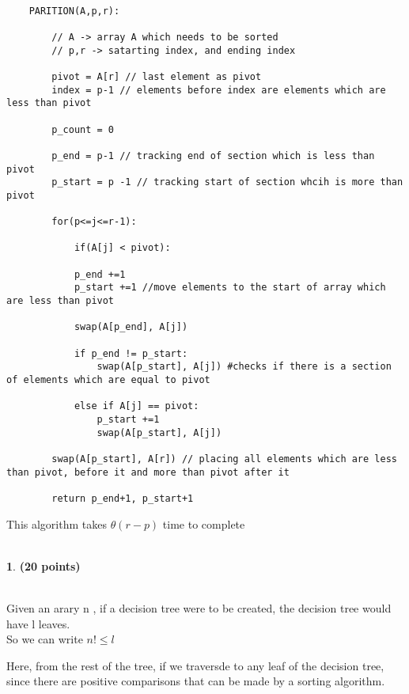 \documentclass[11pt]{article}
\theoremstyle{definition}
\newtheorem{prob}{}
\newcommand{\solution}{\medskip\noindent{\color{DarkBlue}\textbf{Solution:}}}
\begin{document}
\begin{verbatim}
    
    PARITION(A,p,r):

        // A -> array A which needs to be sorted
        // p,r -> satarting index, and ending index

        pivot = A[r] // last element as pivot
        index = p-1 // elements before index are elements which are less than pivot

        p_count = 0

        p_end = p-1 // tracking end of section which is less than pivot
        p_start = p -1 // tracking start of section whcih is more than pivot

        for(p<=j<=r-1):

            if(A[j] < pivot):

            p_end +=1
            p_start +=1 //move elements to the start of array which are less than pivot

            swap(A[p_end], A[j])

            if p_end != p_start:
                swap(A[p_start], A[j]) #checks if there is a section of elements which are equal to pivot

            else if A[j] == pivot:
                p_start +=1
                swap(A[p_start], A[j])
        
        swap(A[p_start], A[r]) // placing all elements which are less than pivot, before it and more than pivot after it

        return p_end+1, p_start+1

\end{verbatim}

This algorithm takes $\theta(r-p)$ time to complete \\ \\ 

\begin{prob} \textbf{(20 points)}
\end{prob}
\solution \\

Given an arary n , if a decision tree were to be created, the decision tree would have l leaves. \\

So we can write $n! \leq l$

Here, from the rest of the tree, if we traversde to any leaf of the decision tree, since there are positive comparisons that can be made by a sorting algorithm.
\end{document}
